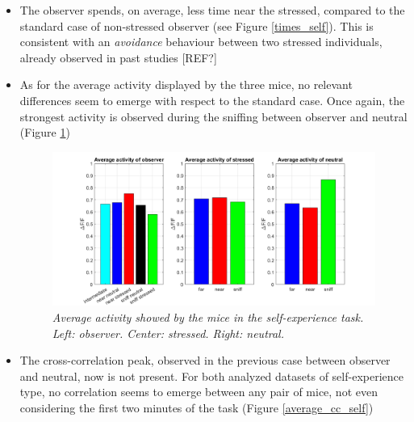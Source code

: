 \documentclass[12pt, a4paper]{article}
\begin{document}
\begin{itemize}
	\item The observer spends, on average, less time near the stressed, compared to the standard case of non-stressed observer (see Figure \ref{times_self}). This is consistent with an \textit{avoidance} behaviour between two stressed individuals, already observed in past studies [REF?]
	
	\item As for the average activity displayed by the three mice, no relevant differences seem to emerge with respect to the standard case. Once again, the strongest activity is observed during the sniffing between observer and neutral (Figure \ref{activity_barplot_self})
	
	\begin{figure}[H]
		
		\begin{center}
			\hspace*{-1.2cm}
			\includegraphics[scale=.38]{activity_barplot_self.png} 
		\end{center} 
		\caption{\textit{Average activity showed by the mice in the self-experience task. Left: observer. Center: stressed. Right: neutral.}}
		\label{activity_barplot_self}
	\end{figure}
	
	\item The cross-correlation peak, observed in the previous case between observer and neutral, now is not present. For both analyzed datasets of self-experience type, no correlation seems to emerge between any pair of mice, not even considering the first two minutes of the task (Figure \ref{average_cc_self})
	
	\begin{figure}[H]
		

\end{figure}
\end{itemize}
\end{document}

